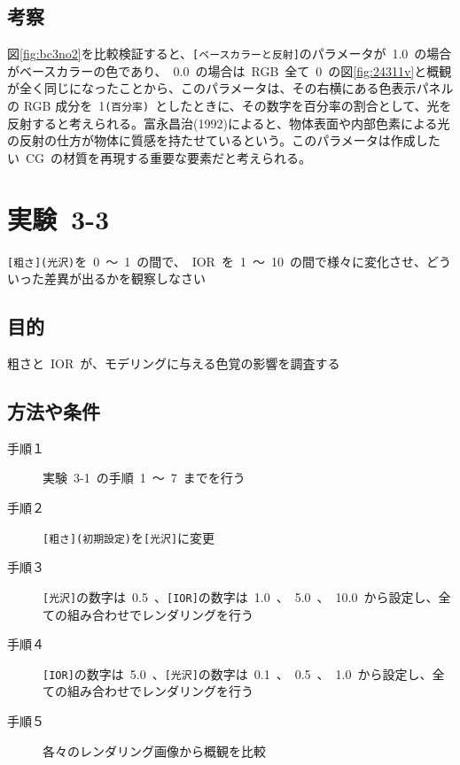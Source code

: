 \documentclass[a4j]{jarticle}
\begin{document}
\subsection{考察}
%
図\ref{fig:bc3no2}を比較検証すると、\verb|[ベースカラーと反射]|のパラメータが\ 1.0\ の場合がベースカラーの色であり、\ 0.0\ の場合は\ RGB\ 全て\ 0\ の図\ref{fig:24311v}と概観が全く同じになったことから、このパラメータは、その右横にある色表示パネルの RGB 成分を\ 1\verb|(百分率)|\ としたときに、その数字を百分率の割合として、光を反射すると考えられる。富永昌治(1992)によると、物体表面や内部色素による光の反射の仕方が物体に質感を持たせているという\cite{tominaga}。このパラメータは作成したい\ CG\ の材質を再現する重要な要素だと考えられる。
%

\newpage
\section{実験\ 3-3}
\verb|[粗さ](光沢)|を\ 0\ ～\ 1\ の間で、\ IOR\ を\ 1\ ～\ 10\ の間で様々に変化させ、どういった差異が出るかを観察しなさい
\subsection{目的}
%
粗さと\ IOR\ が、モデリングに与える色覚の影響を調査する
%
\subsection{方法や条件}
%
\begin{description}
  \item[手順１] 実験\ 3-1\ の手順\ 1\ ～\ 7\ までを行う
  \item[手順２] \verb|[粗さ](初期設定)|を\verb|[光沢]|に変更
  \item[手順３] \verb|[光沢]|の数字は\ 0.5\ 、\verb|[IOR]|の数字は\ 1.0\ 、\ 5.0\ 、\ 10.0\ から設定し、全ての組み合わせでレンダリングを行う
  \item[手順４] \verb|[IOR]|の数字は\ 5.0\ 、\verb|[光沢]|の数字は\ 0.1\ 、\ 0.5\ 、\ 1.0\ から設定し、全ての組み合わせでレンダリングを行う
  \item[手順５] 各々のレンダリング画像から概観を比較
\end{description}
%
\end{document}
